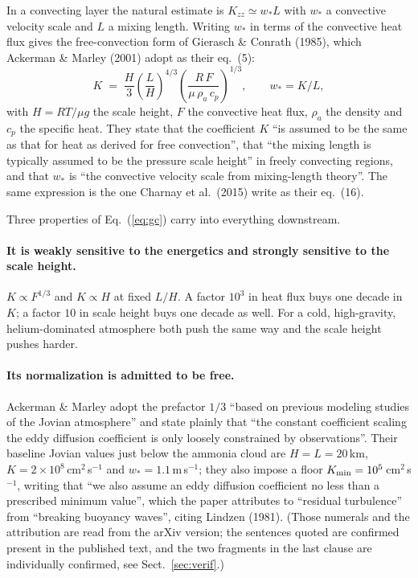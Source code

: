 \documentclass[english,a4paper]{my_memo}
\begin{document}
In a convecting layer the natural estimate is $K_{zz} \simeq w_* L$ with
$w_*$ a convective velocity scale and $L$ a mixing length. Writing $w_*$
in terms of the convective heat flux gives the free-convection form of
Gierasch \& Conrath (1985), which Ackerman \& Marley (2001) adopt as their
eq.~(5):
%
\begin{equation}
  K \;=\; \frac{H}{3}\left(\frac{L}{H}\right)^{4/3}
          \left(\frac{R\,F}{\mu\,\rho_a\,c_p}\right)^{1/3},
  \qquad w_* = K/L,
  \label{eq:gc}
\end{equation}
%
with $H = RT/\mu g$ the scale height, $F$ the convective heat flux, $\rho_a$
the density and $c_p$ the specific heat. They state that the coefficient
$K$ ``is assumed to be the same as that for heat as derived for free
convection'', that ``the mixing length is typically assumed to be the
pressure scale height'' in freely convecting regions, and that $w_*$ is
``the convective velocity scale from mixing-length theory''. The same
expression is the one Charnay et al.\ (2015) write as their eq.~(16).

Three properties of Eq.~(\ref{eq:gc}) carry into everything downstream.

\paragraph{It is weakly sensitive to the energetics and strongly sensitive
to the scale height.} $K \propto F^{1/3}$ and $K \propto H$ at fixed $L/H$.
A factor $10^{3}$ in heat flux buys one decade in $K$; a factor $10$ in
scale height buys one decade as well. For a cold, high-gravity,
helium-dominated atmosphere both push the same way and the scale height
pushes harder.

\paragraph{Its normalization is admitted to be free.} Ackerman \& Marley
adopt the prefactor $1/3$ ``based on previous modeling studies of the Jovian
atmosphere'' and state plainly that ``the constant coefficient scaling the
eddy diffusion coefficient is only loosely constrained by observations''.
Their baseline Jovian values just below the ammonia cloud are $H = L =
20$\,km, $K = 2\times10^{8}$\,cm$^{2}$\,s$^{-1}$ and $w_* =
1.1$\,m\,s$^{-1}$; they also impose a floor $K_{\rm min} =
10^{5}$\,cm$^{2}$\,s$^{-1}$, writing that ``we also assume an eddy diffusion
coefficient no less than a prescribed minimum value'', which the paper
attributes to ``residual turbulence'' from ``breaking buoyancy waves'',
citing Lindzen (1981). (Those numerals and the attribution are read from the
arXiv version; the sentences quoted are confirmed present in the published
text, and the two fragments in the last clause are individually confirmed,
see Sect.~\ref{sec:verif}.)
\end{document}
